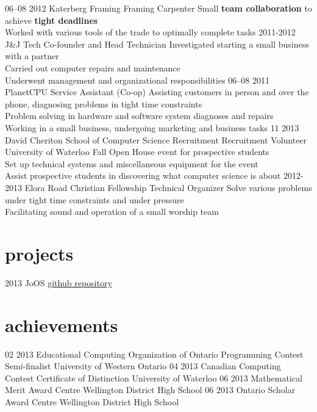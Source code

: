 \documentclass[]{friggeri-cv}
\begin{document}
\begin{entrylist}
  \entry
    {06–08 2012}
    {Katerberg Framing}
    {Framing Carpenter}
    {Small \textbf{team collaboration} to achieve \textbf{tight deadlines} \\
    Worked with various tools of the trade to optimally complete tasks}
  \entry
  	{2011-2012}
  	{J\&J Tech}
  	{Co-founder and Head Technician}
  	{Investigated starting a small business with a partner \\
	Carried out computer repairs and maintenance \\
	Underwent management and organizational responsibilities}
  \entry
    {06–08 2011}
    {PlanetCPU}
    {Service Assistant (Co-op)}
    {Assisting customers in person and over the phone, diagnosing problems in tight time constraints \\
	Problem solving in hardware and software system diagnoses and repairs \\
	Working in a small business, undergoing marketing and business tasks}
  \entry
  	{11 2013}
  	{David Cheriton School of Computer Science Recruitment}
  	{Recruitment Volunteer}
	{University of Waterloo Fall Open House event for prospective students \\
  	Set up technical systems and miscellaneous equipment for the event \\
	Assist prospective students in discovering what computer science is about}
  \entry
  	{2012-2013}
  	{Elora Road Christian Fellowship}
  	{Technical Organizer}
	{Solve various problems under tight time constraints and under pressure \\
	Facilitating sound and operation of a small worship team}
  	

\end{entrylist}

\section{projects}

\begin{entrylist}
  \entry
    {2013}
    {JoOS}
    {\href{http://github.com/xlegoz/JoOS}{github repository}}
    {}
\end{entrylist}

\section{achievements}

\begin{entrylist}
  \entry
  	{02 2013}
  	{Educational Computing Organization of Ontario Programming Contest Semi-finalist}
  	{University of Western Ontario}
  	{}
  \entry
	{04 2013}  	
  	{Canadian Computing Contest Certificate of Distinction}
  	{University of Waterloo}
  	{}
  \entry
  	{06 2013}
  	{Mathematical Merit Award}
  	{Centre Wellington District High School}
  	{}
  \entry
  	{06 2013}
  	{Ontario Scholar Award}
  	{Centre Wellington District High School}
  	{}

\end{entrylist}
\end{document}
